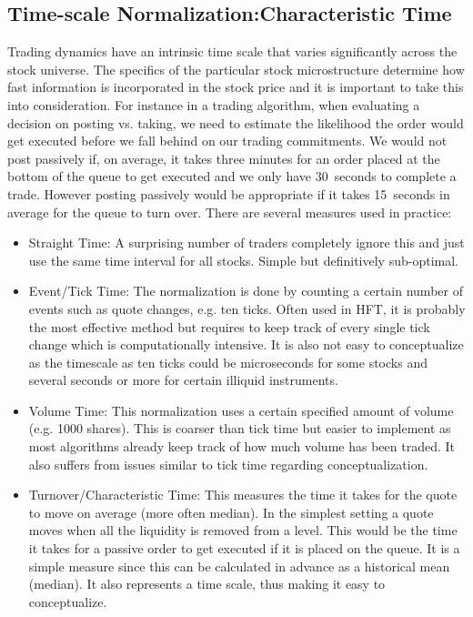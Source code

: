 \subsection{Time-scale Normalization:Characteristic Time}

Trading dynamics have an intrinsic time scale that varies significantly across the stock universe. The specifics of the particular stock microstructure determine how fast information is incorporated in the stock price and it is important to take this into consideration. For instance in a trading algorithm, when evaluating a decision on posting vs. taking, we need to estimate the likelihood the order would get executed before we fall behind on our trading commitments. We would not post passively if, on average, it takes three minutes for an order placed at the bottom of the queue to get executed and we only have 30~seconds to complete a trade. However posting passively would be appropriate if it takes 15~seconds in average for the queue to turn over. There are several measures used in practice:
        \begin{itemize}
        \item Straight Time: A surprising number of traders completely ignore this and just use the same time interval for all stocks. Simple but definitively sub-optimal.
        \item Event/Tick Time: The normalization is done by counting a certain number of events such as quote changes, e.g. ten ticks. Often used in HFT, it is probably the most effective method but requires to keep track of every single tick change which is computationally intensive. It is also not easy to conceptualize as the timescale as ten ticks could be microseconds for some stocks and several seconds or more for certain illiquid instruments.
        \item Volume Time: This normalization uses a certain specified amount of volume (e.g. 1000 shares). This is coarser than tick time but easier to implement as most algorithms already keep track of how much volume has been traded. It also suffers from issues similar to tick time regarding conceptualization.
        \item Turnover/Characteristic Time: This measures the time it takes for the quote to move on average (more often median). In the simplest setting a quote moves when all the liquidity is removed from a level. This would be the time it takes for a passive order to get executed if it is placed on the queue. It is a simple measure since this can be calculated in advance as a historical mean (median). It also represents a time scale, thus making it easy to conceptualize.
        \end{itemize}


